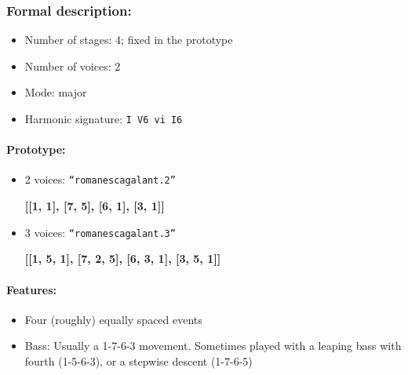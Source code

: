 \documentclass[11pt, openany]{article}
\begin{document}
\subsubsection{Formal description:}
\begin{itemize}
\item Number of stages: 4; fixed in the prototype
\item Number of voices: 2
\item Mode: major
\item Harmonic signature: \texttt{I V6 vi I6}
\end{itemize}

\paragraph{Prototype:}
\begin{itemize}
\item 2 voices: \texttt{“romanescagalant.2”}
	\begin{center}
	\textbf{[[1, 1], [7, 5], [6, 1], [3, 1]]}
	\end{center}
\item 3 voices: \texttt{“romanescagalant.3”}
	\begin{center}
	\textbf{[[1, 5, 1], [7, 2, 5], [6, 3, 1], [3, 5, 1]]}
	\end{center}
\end{itemize}

\paragraph{Features:}
\begin{itemize}
\item Four (roughly) equally spaced events
\item Bass: Usually a 1-7-6-3 movement. Sometimes played with a leaping bass with fourth (1-5-6-3), or a stepwise descent (1-7-6-5)
\end{itemize}
\end{document}
